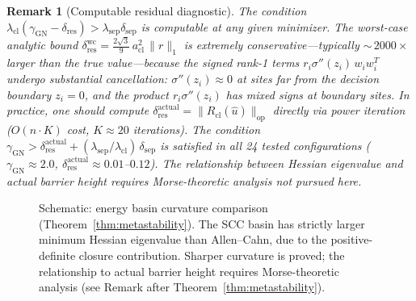 \documentclass[lettersize,journal]{IEEEtran}
\newtheorem{remark}{Remark}
\begin{document}
\begin{remark}[Computable residual diagnostic]
The condition $\lambda_{\mathrm{cl}}(\gamma_{\mathrm{GN}} - \delta_{\mathrm{res}}) > \lambda_{\mathrm{sep}}\delta_{\mathrm{sep}}$ is \emph{computable} at any given minimizer. The worst-case analytic bound $\delta_{\mathrm{res}}^{\mathrm{wc}} = \frac{2\sqrt{3}}{9}\,a_{\mathrm{cl}}^2\,\|r\|_1$ is extremely conservative---typically ${\sim}\,2000\times$ larger than the true value---because the signed rank-1 terms $r_i\sigma''(z_i)\,w_i w_i^T$ undergo substantial cancellation: $\sigma''(z_i) \approx 0$ at sites far from the decision boundary $z_i = 0$, and the product $r_i\sigma''(z_i)$ has mixed signs at boundary sites. In practice, one should compute $\delta_{\mathrm{res}}^{\mathrm{actual}} = \|R_{\mathrm{cl}}(\hat{u})\|_{\mathrm{op}}$ directly via power iteration ($O(n \cdot K)$ cost, $K \approx 20$ iterations). The condition $\gamma_{\mathrm{GN}} > \delta_{\mathrm{res}}^{\mathrm{actual}} + (\lambda_{\mathrm{sep}}/\lambda_{\mathrm{cl}})\,\delta_{\mathrm{sep}}$ is satisfied in all 24 tested configurations ($\gamma_{\mathrm{GN}} \approx 2.0$, $\delta_{\mathrm{res}}^{\mathrm{actual}} \approx 0.01$--$0.12$). The relationship between Hessian eigenvalue and actual barrier height requires Morse-theoretic analysis not pursued here.
\end{remark}

\begin{figure}[!t]
\centering
{}
\caption{Schematic: energy basin curvature comparison (Theorem~\ref{thm:metastability}). The SCC basin has strictly larger minimum Hessian eigenvalue than Allen--Cahn, due to the positive-definite closure contribution. Sharper curvature is proved; the relationship to actual barrier height requires Morse-theoretic analysis (see Remark after Theorem~\ref{thm:metastability}).}
\label{fig:basin}
\end{figure}
\end{document}
